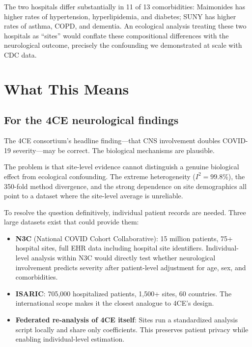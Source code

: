 \documentclass{article}
\begin{document}
The two hospitals differ substantially in 11 of 13 comorbidities: Maimonides
has higher rates of hypertension, hyperlipidemia, and diabetes; SUNY has
higher rates of asthma, COPD, and dementia.  An ecological analysis treating
these two hospitals as ``sites'' would conflate these compositional differences
with the neurological outcome, precisely the confounding we demonstrated at
scale with CDC data.


\section{What This Means}

\subsection{For the 4CE neurological findings}

The 4CE consortium's headline finding---that CNS involvement doubles
COVID-19 severity---may be correct.  The biological mechanisms are plausible.

The problem is that site-level evidence cannot distinguish a genuine
biological effect from ecological confounding.  The extreme heterogeneity
($I^2 = 99.8\%$), the 350-fold method divergence, and the strong dependence
on site demographics all point to a dataset where the site-level average is
unreliable.

To resolve the question definitively, individual patient records are needed.
Three large datasets exist that could provide them:

\begin{itemize}
\item \textbf{N3C} (National COVID Cohort Collaborative): 15 million patients,
75+ hospital sites, full EHR data including hospital site identifiers.
Individual-level analysis within N3C would directly test whether neurological
involvement predicts severity after patient-level adjustment for age, sex,
and comorbidities.

\item \textbf{ISARIC}: 705,000 hospitalized patients, 1,500+ sites, 60
countries.  The international scope makes it the closest analogue to 4CE's
design.

\item \textbf{Federated re-analysis of 4CE itself}: Sites run a standardized
analysis script locally and share only coefficients.  This preserves patient
privacy while enabling individual-level estimation.
\end{itemize}
\end{document}
